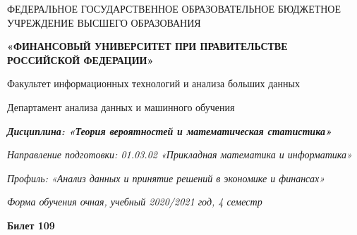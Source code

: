 \documentclass[a4paper,14pt]{article}
\begin{document}
\begin{center}
ФЕДЕРАЛЬНОЕ ГОСУДАРСТВЕННОЕ ОБРАЗОВАТЕЛЬНОЕ БЮДЖЕТНОЕ УЧРЕЖДЕНИЕ ВЫСШЕГО ОБРАЗОВАНИЯ

    \textbf{«ФИНАНСОВЫЙ УНИВЕРСИТЕТ ПРИ ПРАВИТЕЛЬСТВЕ РОССИЙСКОЙ ФЕДЕРАЦИИ»}

Факультет информационных технологий и анализа больших данных

Департамент анализа данных и машинного обучения

\textit{
	\textbf{Дисциплина: «Теория вероятностей и математическая статистика»}}

\textit{Направление подготовки: 01.03.02 «Прикладная математика и информатика»}

\textit{Профиль: «Анализ данных и принятие решений в экономике и финансах»}

\textit{Форма обучения очная, учебный 2020/2021 год, 4 семестр}

\textbf{Билет 109}

\end{center}
\end{document}
